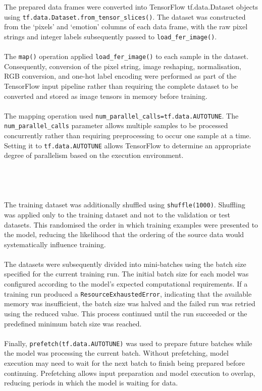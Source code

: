 \documentclass[12pt, a4paper]{report}
\begin{document}
				The prepared data frames were converted into TensorFlow tf.data.Dataset objects using \texttt{tf.data.Dataset.from\_tensor\_slices()}. The dataset was constructed from the `pixels' and `emotion' columns of each data frame, with the raw pixel strings and integer labels subsequently passed to \texttt{load\_fer\_image()}.\\\\
				The \texttt{map()} operation applied \texttt{load\_fer\_image()} to each sample in the dataset. Consequently, conversion of the pixel string, image reshaping, normalisation, RGB conversion, and one-hot label encoding were performed as part of the TensorFlow input pipeline rather than requiring the complete dataset to be converted and stored as image tensors in memory before training.\\\\
				The mapping operation used \texttt{num\_parallel\_calls=tf.data.AUTOTUNE}. The \\\texttt{num\_parallel\_calls} parameter allows multiple samples to be processed concurrently rather than requiring preprocessing to occur one sample at a time. Setting it to \texttt{tf.data.AUTOTUNE} allows TensorFlow to determine an appropriate degree of parallelism based on the execution environment.\\\\\\\\\\
				The training dataset was additionally shuffled using \texttt{shuffle(1000)}. Shuffling was applied only to the training dataset and not to the validation or test datasets. This randomised the order in which training examples were presented to the model, reducing the likelihood that the ordering of the source data would systematically influence training.\\\\
				The datasets were subsequently divided into mini-batches using the batch size specified for the current training run. The initial batch size for each model was configured according to the model's expected computational requirements. If a training run produced a \texttt{ResourceExhaustedError}, indicating that the available memory was insufficient, the batch size was halved and the failed run was retried using the reduced value. This process continued until the run succeeded or the predefined minimum batch size was reached.\\\\
				Finally, \texttt{prefetch(tf.data.AUTOTUNE)} was used to prepare future batches while the model was processing the current batch. Without prefetching, model execution may need to wait for the next batch to finish being prepared before continuing. Prefetching allows input preparation and model execution to overlap, reducing periods in which the model is waiting for data.\\\\
\end{document}
